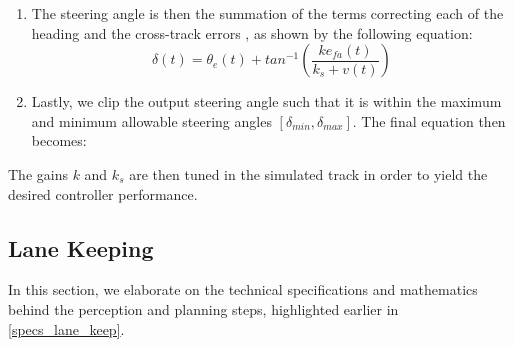 \begin{enumerate}
\begin{equation}
    tan^{-1}(\frac{k e_{fa}}{k_s + v})
\end{equation}

\item The steering angle is then the summation of the terms correcting each of the heading and the cross-track errors \cite{Hoffmann07autonomousautomobile}, as shown by the following equation:
\begin{equation}
    \delta(t) = \theta_e(t) + tan^{-1}(\frac{k e_{fa}(t)}{k_s + v(t)})
\end{equation}

\item Lastly, we clip the output steering angle such that it is within the maximum and minimum allowable steering angles \textbf{\([\delta_{min}, \delta_{max}]\)}. The final equation then becomes:
\end{enumerate}
The gains \textbf{\(k\)} and \textbf{\(k_s\)} are then tuned in the simulated track in order to yield the desired controller performance.

\subsection{Lane Keeping}
\label{method_lane_keep}
In this section, we elaborate on the technical specifications and mathematics behind the perception and planning steps, highlighted earlier in \ref{specs_lane_keep}.

